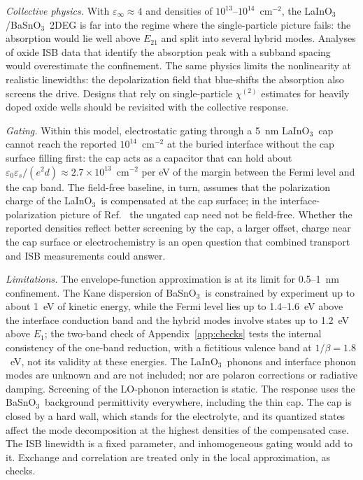 \documentclass[11pt]{article}
\newcommand{\LIO}{\texorpdfstring{LaInO$_3$}{LaInO3}}
\newcommand{\BSO}{\texorpdfstring{BaSnO$_3$}{BaSnO3}}
\begin{document}
\emph{Collective physics.} With $\varepsilon_\infty\approx4$ and densities of $10^{13}$--$10^{14}$~cm$^{-2}$, the \LIO/\BSO\ 2DEG is far into the regime where the single-particle picture fails: the absorption would lie well above $E_{21}$ and split into several hybrid modes. Analyses of oxide ISB data that identify the absorption peak with a subband spacing would overestimate the confinement. The same physics limits the nonlinearity at realistic linewidths: the depolarization field that blue-shifts the absorption also screens the drive. Designs that rely on single-particle $\chi^{(2)}$ estimates for heavily doped oxide wells should be revisited with the collective response.

\emph{Gating.} Within this model, electrostatic gating through a 5~nm \LIO\ cap cannot reach the reported $10^{14}$~cm$^{-2}$ at the buried interface without the cap surface filling first: the cap acts as a capacitor that can hold about $\varepsilon_0\varepsilon_s/(e^2d)\approx2.7\times10^{13}$~cm$^{-2}$ per eV of the margin between the Fermi level and the cap band. The field-free baseline, in turn, assumes that the polarization charge of the \LIO\ is compensated at the cap surface; in the interface-polarization picture of Ref.~\cite{Kim2019LIO} the ungated cap need not be field-free. Whether the reported densities reflect better screening by the cap, a larger offset, charge near the cap surface or electrochemistry is an open question that combined transport and ISB measurements could answer.

\emph{Limitations.} The envelope-function approximation is at its limit for 0.5--1~nm confinement. The Kane dispersion of \BSO\ is constrained by experiment up to about 1~eV of kinetic energy, while the Fermi level lies up to 1.4--1.6~eV above the interface conduction band and the hybrid modes involve states up to 1.2~eV above $E_1$; the two-band check of Appendix~\ref{app:checks} tests the internal consistency of the one-band reduction, with a fictitious valence band at $1/\beta=1.8$~eV, not its validity at these energies. The \LIO\ phonons and interface phonon modes are unknown and are not included; nor are polaron corrections or radiative damping. Screening of the LO-phonon interaction is static. The response uses the \BSO\ background permittivity everywhere, including the thin cap. The cap is closed by a hard wall, which stands for the electrolyte, and its quantized states affect the mode decomposition at the highest densities of the compensated case. The ISB linewidth is a fixed parameter, and inhomogeneous gating would add to it. Exchange and correlation are treated only in the local approximation, as checks.
\end{document}
